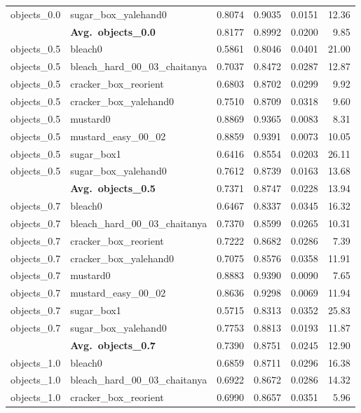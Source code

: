 \begin{longtable}{llrrrr}
  objects_0.0 & sugar\_box\_yalehand0 & 0.8074 & 0.9035 & 0.0151 & 12.36 \\
  \cmidrule{2-6}
  & \textbf{Avg.~objects_0.0} & 0.8177 & 0.8992 & 0.0200 & 9.85 \\
  \midrule
  objects_0.5 & bleach0 & 0.5861 & 0.8046 & 0.0401 & 21.00 \\
  objects_0.5 & bleach\_hard\_00\_03\_chaitanya & 0.7037 & 0.8472 & 0.0287 & 12.87 \\
  objects_0.5 & cracker\_box\_reorient & 0.6803 & 0.8702 & 0.0299 & 9.92 \\
  objects_0.5 & cracker\_box\_yalehand0 & 0.7510 & 0.8709 & 0.0318 & 9.60 \\
  objects_0.5 & mustard0 & 0.8869 & 0.9365 & 0.0083 & 8.31 \\
  objects_0.5 & mustard\_easy\_00\_02 & 0.8859 & 0.9391 & 0.0073 & 10.05 \\
  objects_0.5 & sugar\_box1 & 0.6416 & 0.8554 & 0.0203 & 26.11 \\
  objects_0.5 & sugar\_box\_yalehand0 & 0.7612 & 0.8739 & 0.0163 & 13.68 \\
  \cmidrule{2-6}
  & \textbf{Avg.~objects_0.5} & 0.7371 & 0.8747 & 0.0228 & 13.94 \\
  \midrule
  objects_0.7 & bleach0 & 0.6467 & 0.8337 & 0.0345 & 16.32 \\
  objects_0.7 & bleach\_hard\_00\_03\_chaitanya & 0.7370 & 0.8599 & 0.0265 & 10.31 \\
  objects_0.7 & cracker\_box\_reorient & 0.7222 & 0.8682 & 0.0286 & 7.39 \\
  objects_0.7 & cracker\_box\_yalehand0 & 0.7075 & 0.8576 & 0.0358 & 11.91 \\
  objects_0.7 & mustard0 & 0.8883 & 0.9390 & 0.0090 & 7.65 \\
  objects_0.7 & mustard\_easy\_00\_02 & 0.8636 & 0.9298 & 0.0069 & 11.94 \\
  objects_0.7 & sugar\_box1 & 0.5715 & 0.8313 & 0.0352 & 25.83 \\
  objects_0.7 & sugar\_box\_yalehand0 & 0.7753 & 0.8813 & 0.0193 & 11.87 \\
  \cmidrule{2-6}
  & \textbf{Avg.~objects_0.7} & 0.7390 & 0.8751 & 0.0245 & 12.90 \\
  \midrule
  objects_1.0 & bleach0 & 0.6859 & 0.8711 & 0.0296 & 16.38 \\
  objects_1.0 & bleach\_hard\_00\_03\_chaitanya & 0.6922 & 0.8672 & 0.0286 & 14.32 \\
  objects_1.0 & cracker\_box\_reorient & 0.6990 & 0.8657 & 0.0351 & 5.96 \\

\end{longtable}

